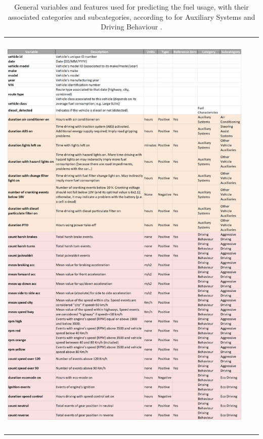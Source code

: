\begin{table}[h!]
\centering
 \begin{tabular}{c@{\qquad}c@{\qquad}c}
\includegraphics[width=395pt, height=580pt, keepaspectratio]{figures/chapter6_LucaFleet/FARUsedpt1.png}
  \end{tabular} 
  \caption{General variables and features used for predicting the fuel usage, with their associated categories and subcategories, according to \parencite{zacharof2016review} for Auxiliary Systems and Driving Behaviour \label{table:annex-FARUsedpt1}.}
\end{table}

